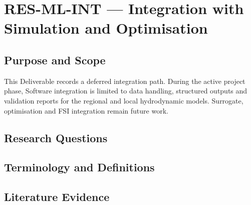 
\section{RES-ML-INT --- Integration with Simulation and Optimisation}
\label{sec:res-ml-int}

\subsection{Purpose and Scope}
\label{sec:res-ml-int-purpose}

This Deliverable records a deferred integration path. During the
active project phase, Software integration is limited to data
handling, structured outputs and validation reports for the regional
and local hydrodynamic models. Surrogate, optimisation and FSI
integration remain future work.

\subsection{Research Questions}
\label{sec:res-ml-int-research-questions}


\subsection{Terminology and Definitions}
\label{sec:res-ml-int-definitions}


\subsection{Literature Evidence}
\label{sec:res-ml-int-literature-evidence}

%

